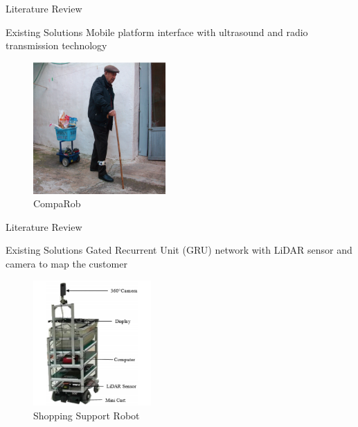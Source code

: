 \documentclass{beamer}
\begin{document}
\begin{frame}{Literature Review}
  \begin{block}{Existing Solutions}
        Mobile platform interface with ultrasound and radio transmission technology~\cite{Sales2016-CompaRob}
  \end{block}
    \begin{figure}[b]
        \centering
        \includegraphics[width=0.45\textwidth]{figs/img/CompaRob}
        \caption{CompaRob}
    \end{figure}
\end{frame}


\begin{frame}{Literature Review}
  \begin{block}{Existing Solutions}
        Gated Recurrent Unit (GRU) network with LiDAR sensor and camera to map the customer~\cite{islam_lam_fukuda_kobayashi_kuno_2019}
  \end{block}
    \begin{figure}[b]
        \centering
        \includegraphics[width=0.40\textwidth]{figs/img/ShoppingSuportRobot}
        \caption{Shopping Support Robot}
    \end{figure}
\end{frame}
\end{document}
